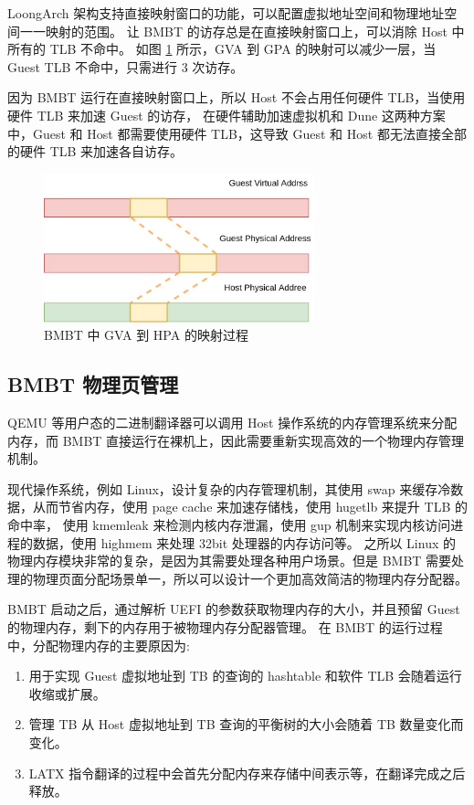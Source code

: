 LoongArch 架构支持直接映射窗口的功能，可以配置虚拟地址空间和物理地址空间一一映射的范围。
让 BMBT 的访存总是在直接映射窗口上，可以消除 Host 中所有的 TLB 不命中。 如图 \ref{fig:bmbt_gva_hpa} 所示，GVA 到 GPA 的映射可以减少一层，当 Guest TLB 不命中，只需进行 3 次访存。

因为 BMBT 运行在直接映射窗口上，所以 Host 不会占用任何硬件 TLB，当使用硬件 TLB 来加速 Guest 的访存，
在硬件辅助加速虚拟机和 Dune 这两种方案中，Guest 和 Host 都需要使用硬件 TLB，这导致 Guest 和 Host 都无法直接全部的硬件 TLB 来加速各自访存。

\begin{figure}[!htbp]
	\centering
	\includegraphics[width=0.7\textwidth]{./images/sys-as3.jpg}
	\caption{BMBT 中 GVA 到 HPA 的映射过程}
	\label{fig:bmbt_gva_hpa}
\end{figure}

\subsection{BMBT 物理页管理}
QEMU 等用户态的二进制翻译器可以调用 Host 操作系统的内存管理系统来分配内存，而 BMBT 直接运行在裸机上，因此需要重新实现高效的一个物理内存管理机制。

现代操作系统，例如 Linux，设计复杂的内存管理机制，其使用 swap 来缓存冷数据，从而节省内存，使用 page cache 来加速存储栈，使用 hugetlb 来提升 TLB 的命中率，
使用 kmemleak 来检测内核内存泄漏，使用 gup 机制来实现内核访问进程的数据，使用 highmem 来处理 32bit 处理器的内存访问等。
之所以 Linux 的物理内存模块非常的复杂，是因为其需要处理各种用户场景。但是 BMBT 需要处理的物理页面分配场景单一，所以可以设计一个更加高效简洁的物理内存分配器。

BMBT 启动之后，通过解析 UEFI 的参数获取物理内存的大小，并且预留 Guest 的物理内存，剩下的内存用于被物理内存分配器管理。
在 BMBT 的运行过程中，分配物理内存的主要原因为:
\begin{enumerate}
	\item 用于实现 Guest 虚拟地址到 TB 的查询的 hashtable 和软件 TLB 会随着运行收缩或扩展。
	\item 管理 TB 从 Host 虚拟地址到 TB 查询的平衡树的大小会随着 TB 数量变化而变化。
	\item LATX 指令翻译的过程中会首先分配内存来存储中间表示等，在翻译完成之后释放。
\end{enumerate}

